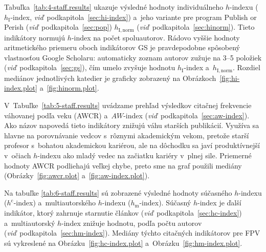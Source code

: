 Tabuľka~\ref{tab:4-staff.results} ukazuje výsledné hodnoty individuálneho
$h$-indexu ($h_{\mathrm{I}}$-index, \emph{viď}~podkapitola~\ref{sec:hi-index})
a~jeho variante pre program Publish or Perish
(\emph{viď}~podkapitola~\ref{sec:pop}) $h_{\mathrm{I,norm}}$
(\emph{viď}~podkapitola~\ref{sec:hinorm}).  Tieto indikátory normujú $h$-index
na počet spoluautorov.  Rádovo vyššie hodnoty aritmetického priemeru oboch
indikátorov GS je pravdepodobne spôsobený vlastnosťou Google Scholaru:
automaticky zoznam autorov zužuje na 3--5 položiek
(\emph{viď}~podkapitola~\ref{sec:gs}), čím umelo zvyšuje hodnotu
$h_{\mathrm{I}}$-index a~$h_{\mathrm{I,norm}}$.  Rozdiel mediánov jednotlivých
katedier je graficky zobrazený na Obrázkoch~\ref{fig:hi-index.plot}
a~\ref{fig:hinorm.plot}.

V~Tabuľke~\ref{tab:5-staff.results} uvádzame prehľad výsledkov citačnej
frekvencie váhovanej podľa veku (AWCR) a~$AW$-index
(\emph{viď}~podkapitola~\ref{sec:aw-index}).  Ako názov napovedá tieto
indikátory znižujú váhu starších publikácií.  Využíva sa hlavne na porovnávanie
vedcov s~rôznymi akademickým vekom, pretože starší profesor s~bohatou
akademickou kariérou, ale na dôchodku sa javí produktívnejší v~očiach $h$-indexu
ako mladý vedec na začiatku kariéry v~plnej sile.  Priemerné hodnoty AWCR
podliehajú veľkej chybe, preto sme na graf použili mediány
(Obrázky~\ref{fig:awcr.plot} a~\ref{fig:aw-index.plot}).

Na tabuľke \ref{tab:6-staff.results} sú zobrazené výsledné hodnoty súčasného
$h$-indexu ($h^{\mathrm{c}}$-index) a~multiautorského $h$-indexu
($h_{\mathrm{m}}$-index).  Súčasný $h$-index je ďalší indikátor, ktorý zahrnuje
starnutie článkov (\emph{viď}~podkapitola~\ref{sec:hc-index}) a~multiautorský
$h$-index znižuje hodnotu, podľa počtu autorov
(\emph{viď}~podkapitola~\ref{sec:hm-index}).  Mediány týchto citačných
indikátorov pre FPV sú vykreslené na Obrázku~\ref{fig:hc-index.plot}
a~Obrázku~\ref{fig:hm-index.plot}.

